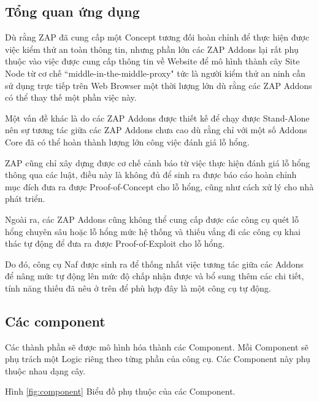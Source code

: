 \documentclass[./../main.tex]{subfiles}
\begin{document}
\subsection{Tổng quan ứng dụng}

Dù rằng ZAP đã cung cấp một Concept tương đối hoàn chỉnh để thực hiện được việc kiểm thử an toàn thông tin, nhưng phần lớn các ZAP Addons lại rất  phụ thuộc vào việc được cung cấp thông tin về Website để mô hình thành cây Site Node từ cơ chế “middle-in-the-middle-proxy" tức là người kiểm thử an ninh cần sử dụng trực tiếp trên Web Browser một thời lượng lớn dù rằng các ZAP Addons có thể thay thế một phần việc này.

Một vấn đề khác là do các ZAP Addons được thiết kế để chạy được Stand-Alone nên sự tương tác giữa các ZAP Addons chưa cao dù rằng chỉ với một số Addons Core đã có thể hoàn thành lượng lớn công việc đánh giá lỗ hổng.

ZAP cũng chỉ xây dựng được cơ chế cảnh báo từ việc thực hiện đánh giá lỗ hổng thông qua các luật, điều này là không đủ để sinh ra được báo cáo hoàn chỉnh mục đích đưa ra được Proof-of-Concept cho lỗ hổng, cũng như cách xử lý cho nhà phát triển.

Ngoài ra, các ZAP Addons cũng không thể cung cấp được các công cụ quét lỗ hổng chuyên sâu hoặc lỗ hổng mức hệ thống và thiếu vắng đi các công cụ khai thác tự động để đưa ra được Proof-of-Exploit cho lỗ hổng.

Do đó, công cụ Naf được sinh ra để thống nhất việc tương tác giữa các Addons để nâng mức tự động lên mức độ chấp nhận được và bổ sung thêm các chi tiết, tính năng thiếu đã nêu ở trên để phù hợp đây là một công cụ tự động.

\subsection{Các component}
Các thành phần sẽ được mô hình hóa thành các Component. Mỗi Component sẽ phụ trách một Logic riêng theo từng phần của công cụ. Các Component này phụ thuộc nhau dạng cây.

Hình \ref{fig:component} Biểu đồ phụ thuộc của các Component.
\end{document}
